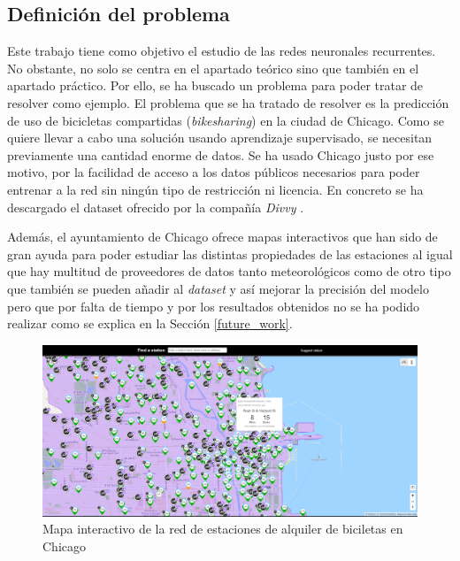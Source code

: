 \subsection{Definición del problema}

Este trabajo tiene como objetivo el estudio de las redes neuronales recurrentes. No obstante, no solo se centra en el apartado teórico sino que también en el apartado práctico. Por ello, se ha buscado un problema para poder tratar de resolver como ejemplo. El problema que se ha tratado de resolver es la predicción de uso de bicicletas compartidas (\textit{bikesharing}) en la ciudad de Chicago. Como se quiere llevar a cabo una solución usando aprendizaje supervisado, se necesitan previamente una cantidad enorme de datos. Se ha usado Chicago justo por ese motivo, por la facilidad de acceso a los datos públicos necesarios para poder entrenar a la red sin ningún tipo de restricción ni licencia. En concreto se ha descargado el dataset ofrecido por la compañía \textit{Divvy} \cite{divvy}.
\newline
 
Además, el ayuntamiento de Chicago ofrece mapas interactivos \cite{chicagomap} que han sido de gran ayuda para poder estudiar las distintas propiedades de las estaciones al igual que hay multitud de proveedores de datos tanto meteorológicos \cite{chicagoweather} como de otro tipo que también se pueden añadir al \textit{dataset} y así mejorar la precisión del modelo pero que por falta de tiempo y por los resultados obtenidos no se ha podido realizar como se explica en la Sección \ref{future_work}.

\begin{figure}[H]
    \centering
    \includegraphics[width=14cm]{images/solution/preprocessing/divvy-map.png}
    \caption{Mapa interactivo de la red de estaciones de alquiler de biciletas en Chicago \cite{chicagomap}}
\end{figure}
